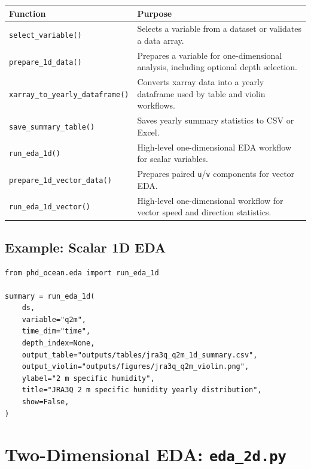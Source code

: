 \documentclass[11pt,a4paper]{article}
\begin{document}
\begin{longtable}{p{}p{}}
\toprule
\textbf{Function} & \textbf{Purpose} \\
\midrule
\endhead

\texttt{select\_variable()} &
Selects a variable from a dataset or validates a data array. \\

\texttt{prepare\_1d\_data()} &
Prepares a variable for one-dimensional analysis, including optional depth selection. \\

\texttt{xarray\_to\_yearly\_dataframe()} &
Converts xarray data into a yearly dataframe used by table and violin workflows. \\

\texttt{save\_summary\_table()} &
Saves yearly summary statistics to CSV or Excel. \\

\texttt{run\_eda\_1d()} &
High-level one-dimensional EDA workflow for scalar variables. \\

\texttt{prepare\_1d\_vector\_data()} &
Prepares paired \texttt{u}/\texttt{v} components for vector EDA. \\

\texttt{run\_eda\_1d\_vector()} &
High-level one-dimensional workflow for vector speed and direction statistics. \\

\bottomrule
\end{longtable}

\subsection{Example: Scalar 1D EDA}

\begin{lstlisting}[style=pythonstyle]
from phd_ocean.eda import run_eda_1d

summary = run_eda_1d(
    ds,
    variable="q2m",
    time_dim="time",
    depth_index=None,
    output_table="outputs/tables/jra3q_q2m_1d_summary.csv",
    output_violin="outputs/figures/jra3q_q2m_violin.png",
    ylabel="2 m specific humidity",
    title="JRA3Q 2 m specific humidity yearly distribution",
    show=False,
)
\end{lstlisting}

\section{Two-Dimensional EDA: \texttt{eda\_2d.py}}
\end{document}

